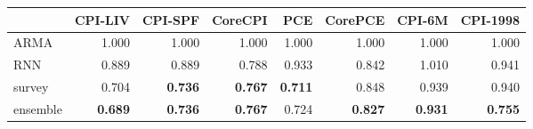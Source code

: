 \begin{tabular}{lrrrrrrr}
\toprule
{} &  CPI-LIV &  CPI-SPF &  CoreCPI &    PCE &  CorePCE &  CPI-6M &  CPI-1998 \\
\midrule
ARMA     &    1.000 &    1.000 &    1.000 &  1.000 &    1.000 &   1.000 &     1.000 \\
RNN      &    0.889 &    0.889 &    0.788 &  0.933 &    0.842 &   1.010 &     0.941 \\
survey   &    0.704 &\textbf{0.736}&\textbf{0.767}&\textbf{0.711}&    0.848 &   0.939 &     0.940 \\
ensemble &\textbf{0.689}&\textbf{0.736}&\textbf{0.767}&  0.724 &\textbf{0.827}&\textbf{0.931} &\textbf{0.755} \\
\bottomrule
\end{tabular}
